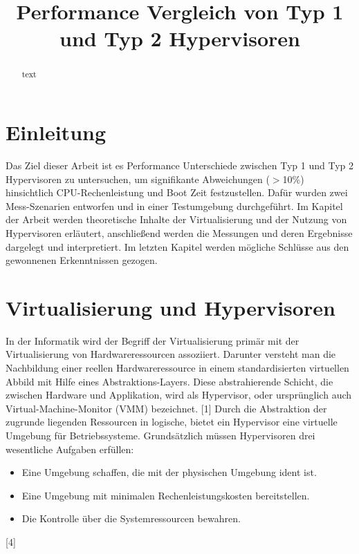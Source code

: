 \documentclass[conference]{IEEEtran}
\begin{document}
\title{Performance Vergleich von Typ 1 und Typ 2 Hypervisoren }

\author
{
}

\maketitle

\begin{abstract}
text  
\end{abstract}

\IEEEpeerreviewmaketitle

\section{Einleitung}
\label{Einleitung}

Das Ziel dieser Arbeit ist es Performance Unterschiede zwischen Typ 1 und Typ 2 Hypervisoren zu untersuchen, um signifikante Abweichungen ($>$10\%) hinsichtlich CPU-Rechenleistung und Boot Zeit festzustellen. Dafür wurden zwei Mess-Szenarien entworfen und in einer Testumgebung durchgeführt. Im Kapitel der Arbeit werden theoretische Inhalte der Virtualisierung und der Nutzung von Hypervisoren erläutert, anschließend werden die Messungen und deren Ergebnisse dargelegt und interpretiert. Im letzten Kapitel werden mögliche Schlüsse aus den gewonnenen Erkenntnissen gezogen. 

\section{Virtualisierung und Hypervisoren}
\label{Virtualisierung und Hypervisoren}	
In der Informatik wird der Begriff der Virtualisierung primär mit der Virtualisierung von Hardwareressourcen assoziiert. Darunter versteht man die Nachbildung einer reellen Hardwareressource in einem standardisierten virtuellen Abbild mit Hilfe eines Abstraktions-Layers. Diese abstrahierende Schicht, die zwischen Hardware und Applikation, wird als Hypervisor, oder ursprünglich auch Virtual-Machine-Monitor (VMM) bezeichnet. [1] Durch die Abstraktion der zugrunde liegenden Ressourcen in logische, bietet ein Hypervisor eine virtuelle Umgebung für Betriebssysteme. Grundsätzlich müssen Hypervisoren drei wesentliche Aufgaben erfüllen: 
\begin{itemize}
	\item Eine Umgebung schaffen, die mit der physischen Umgebung ident ist. 
	\item Eine Umgebung mit minimalen Rechenleistungskosten bereitstellen. 
	\item Die Kontrolle über die Systemressourcen bewahren. 
\end{itemize}
[4]
\end{document}
